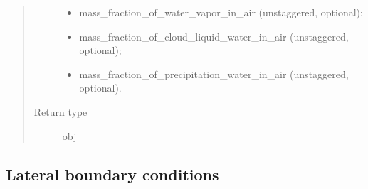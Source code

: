 \documentclass[letterpaper,10pt,english]{sphinxmanual}
\begin{document}
\begin{fulllineitems}
\begin{fulllineitems}
\begin{quote}
\begin{description}
\begin{itemize}
\item {} 
mass\_fraction\_of\_water\_vapor\_in\_air (unstaggered, optional);

\item {} 
mass\_fraction\_of\_cloud\_liquid\_water\_in\_air (unstaggered, optional);

\item {} 
mass\_fraction\_of\_precipitation\_water\_in\_air (unstaggered, optional).

\end{itemize}


\item[{Return type}] \leavevmode
obj

\end{description}\end{quote}

\end{fulllineitems}


\end{fulllineitems}



\subsection{Lateral boundary conditions}
\label{\detokenize{api:lateral-boundary-conditions}}
\end{document}
